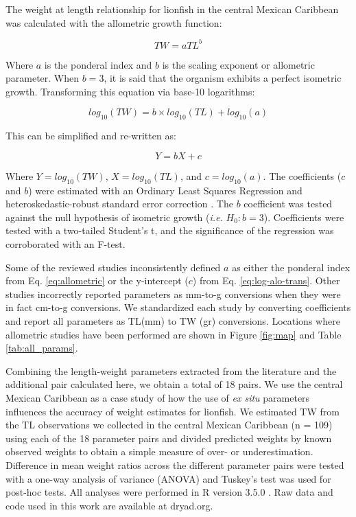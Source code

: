 \documentclass[fleqn,10pt,lineno]{wlpeerj} %
\begin{document}
The weight at length relationship for lionfish in the central Mexican
Caribbean was calculated with the allometric growth function:

\begin{equation}
\label{eq:allometric}
TW = aTL^b
\end{equation}

Where \(a\) is the ponderal index and \(b\) is the scaling exponent or
allometric parameter. When \(b = 3\), it is said that the organism
exhibits a perfect isometric growth. Transforming this equation via
base-10 logarithms:

\begin{equation}
\label{eq:log-alo}
log_{10}(TW) = b\times log_{10}(TL) + log_{10}(a)
\end{equation}

This can be simplified and re-written as:

\begin{equation}
\label{eq:log-alo-trans}
Y = bX + c
\end{equation}

Where \(Y = log_{10}(TW)\), \(X = log_{10}(TL)\), and
\(c = log_{10}(a)\). The coefficients (\(c\) and \(b\)) were estimated
with an Ordinary Least Squares Regression and heteroskedastic-robust
standard error correction \citep{zeileis_2004}. The \(b\) coefficient
was tested against the null hypothesis of isometric growth (\emph{i.e.}
\(H_0: b = 3\)). Coefficients were tested with a two-tailed Student's t,
and the significance of the regression was corroborated with an F-test.

Some of the reviewed studies inconsistently defined \(a\) as either the
ponderal index from Eq. \ref{eq:allometric} or the y-intercept (\(c\))
from Eq. \ref{eq:log-alo-trans}. Other studies incorrectly reported
parameters as mm-to-g conversions when they were in fact cm-to-g
conversions. We standardized each study by converting coefficients and
report all parameters as TL(mm) to TW (gr) conversions. Locations where
allometric studies have been performed are shown in Figure \ref{fig:map}
and Table \ref{tab:all_params}.

Combining the length-weight parameters extracted from the literature and
the additional pair calculated here, we obtain a total of 18 pairs. We
use the central Mexican Caribbean as a case study of how the use of
\emph{ex situ} parameters influences the accuracy of weight estimates
for lionfish. We estimated TW from the TL observations we collected in
the central Mexican Caribbean (n = 109) using each of the 18 parameter
pairs and divided predicted weights by known observed weights to obtain
a simple measure of over- or underestimation. Difference in mean weight
ratios across the different parameter pairs were tested with a one-way
analysis of variance (ANOVA) and Tuskey's test was used for post-hoc
tests. All analyses were performed in R version 3.5.0
\citep{rcore_2018}. Raw data and code used in this work are available at
dryad.org.
\end{document}
